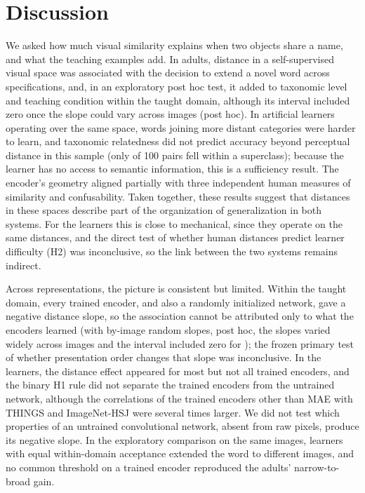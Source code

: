 \documentclass[11pt]{article}
\begin{document}
\section{Discussion}


We asked how much visual similarity explains when two objects share a name, and what the teaching examples add. In adults, distance in a self-supervised visual space was associated with the decision to extend a novel word across specifications, and, in an exploratory post hoc test, it added to taxonomic level and teaching condition within the taught domain, although its interval included zero once the slope could vary across images (post hoc). In artificial learners operating over the same space, words joining more distant categories were harder to learn, and taxonomic relatedness did not predict accuracy beyond perceptual distance in this sample (only \NWithin{} of 100 pairs fell within a superclass); because the learner has no access to semantic information, this is a sufficiency result. The encoder's geometry aligned partially with three independent human measures of similarity and confusability. Taken together, these results suggest that distances in these spaces describe part of the organization of generalization in both systems. For the learners this is close to mechanical, since they operate on the same distances, and the direct test of whether human distances predict learner difficulty (H2) was inconclusive, so the link between the two systems remains indirect.

Across representations, the picture is consistent but limited. Within the taught domain, every trained encoder, and also a randomly initialized network, gave a negative distance slope, so the association cannot be attributed only to what the encoders learned (with by-image random slopes, post hoc, the slopes varied widely across images and the interval included zero for \VcImgTrInclList); the frozen primary test of whether presentation order changes that slope was inconclusive. In the learners, the distance effect appeared for most but not all trained encoders, and the binary H1 rule did not separate the trained encoders from the untrained network, although the correlations of the trained encoders other than MAE with THINGS and ImageNet-HSJ were several times larger. We did not test which properties of an untrained convolutional network, absent from raw pixels, produce its negative slope. In the exploratory comparison on the same images, learners with equal within-domain acceptance extended the word to different images, and no common threshold on a trained encoder reproduced the adults' narrow-to-broad gain.
\end{document}
